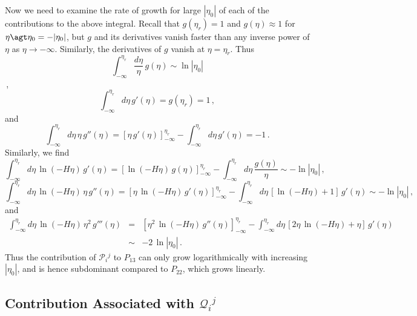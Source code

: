 \documentclass[preprint,prd,showpacs,superscriptaddress]{revtex4}
\begin{document}
Now we need to examine the rate of growth for large $|\eta_0|$ of each of the contributions to the above integral.
Recall that $g(\eta_r)=1$ and $g(\eta) \approx 1$ for $\eta \agt \eta_0 = -|\eta_0|$, but $g$ and its derivatives vanish
faster than any inverse power of $\eta$ as $\eta \rightarrow -\infty$. Similarly, the  derivatives of  $g$ vanish at 
$\eta = \eta_r$.  Thus 
\begin{equation}
\int^{\eta_r}_{-\infty}  \frac{d\eta}{\eta}\, g(\eta) \sim \ln|\eta_0|
\end{equation}\,,
\begin{equation}
\int^{\eta_r}_{-\infty} d\eta\, g'(\eta) = g(\eta_r) =1\,,
\end{equation}
and
\begin{equation}
\int^{\eta_r}_{-\infty} d\eta\, \eta\, g''(\eta)  = \left[\eta\, g'(\eta)\right]^{\eta_r}_{-\infty} -  \int^{\eta_r}_{-\infty} d\eta\, g'(\eta) =-1\,.
\end{equation}
Similarly, we find
 \begin{equation}
\int^{\eta_r}_{-\infty} d\eta\, \ln(-H\eta)\,g'(\eta) = \left[\ln(-H\eta)\,g(\eta)\right]^{\eta_r}_{-\infty} - 
\int^{\eta_r}_{-\infty} d\eta\, \frac{g(\eta)}{\eta} \sim -\ln|\eta_0|\,,
\end{equation}
\begin{equation}
\int^{\eta_r}_{-\infty} d\eta\, \ln(-H\eta)\,\eta \, g''(\eta)   =  \left[\eta\,  \ln(-H\eta)\,g'(\eta)\right]^{\eta_r}_{-\infty} - 
\int^{\eta_r}_{-\infty} d\eta\,[\ln(-H\eta) +1]\, g'(\eta) \sim -\ln|\eta_0|\,,
\end{equation}
and
\begin{eqnarray}
\int^{\eta_r}_{-\infty} d\eta\, \ln(-H\eta)\,\eta^2 \, g'''(\eta)   &=&  \left[\eta^2\,  \ln(-H\eta)\,g''(\eta)\right]^{\eta_r}_{-\infty} - 
\int^{\eta_r}_{-\infty} d\eta\,[2 \eta\, \ln(-H\eta) +\eta]\, g'(\eta)   \nonumber \\
&\sim& -2\, \ln|\eta_0|\,.
\end{eqnarray}
Thus the contribution of  $\mathcal{P}_{i}{}^{j}$ to $P_{13}$ can only grow logarithmically with increasing $|\eta_0|$,
and is hence subdominant compared to $P_{22}$, which grows linearly.

\subsection{Contribution Associated with $\mathcal{Q}_{i}{}^{j}$}
\label{S:Qij}
\end{document}
